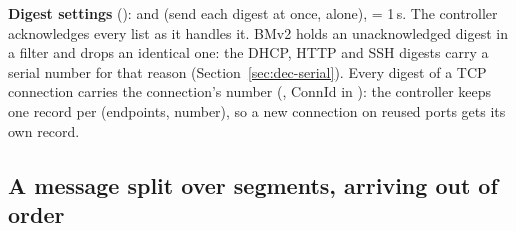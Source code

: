 \textbf{Digest settings} ():  and  (send
each digest at once, alone),  = 1\,s. The controller acknowledges every list as it handles
it. BMv2 holds an unacknowledged digest in a filter and drops an identical one: the DHCP, HTTP and SSH digests carry
a serial number for that reason (Section~\ref{sec:dec-serial}). Every digest of a TCP connection carries the
connection's number (, ConnId in ): the controller keeps one record per (endpoints,
number), so a new connection on reused ports gets its own record.

\subsection{A message split over segments, arriving out of order}
\label{sec:seq}


